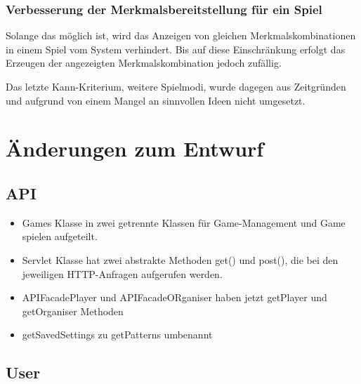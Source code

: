 \documentclass[a4paper]{scrreprt}
\begin{document}
\subsection{Verbesserung der Merkmalsbereitstellung für ein Spiel}
Solange das möglich ist, wird das Anzeigen von gleichen Merkmalskombinationen in einem Spiel vom System verhindert. Bis auf diese Einschränkung erfolgt das Erzeugen der angezeigten Merkmalskombination jedoch zufällig.



\hspace{1cm}

Das letzte Kann-Kriterium, weitere Spielmodi, wurde dagegen aus Zeitgründen und aufgrund von einem Mangel an sinnvollen Ideen nicht umgesetzt.

\chapter{Änderungen zum Entwurf}
\section{API}
\begin{itemize}
    \item Games Klasse in zwei getrennte Klassen für Game-Management und Game spielen aufgeteilt.
    \item Servlet Klasse hat zwei abstrakte Methoden get() und post(), die bei den jeweiligen HTTP-Anfragen aufgerufen werden.
    \item APIFacadePlayer und APIFacadeORganiser haben jetzt getPlayer und getOrganiser Methoden
    \item getSavedSettings zu getPatterns umbenannt
\end{itemize}

\section{User}
\end{document}
